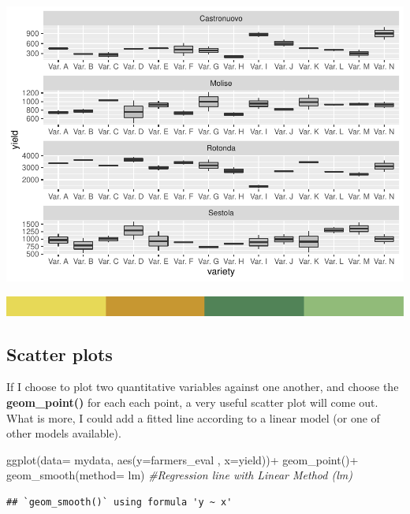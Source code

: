 \documentclass[
]{book}
\newenvironment{Shaded}{\begin{snugshade}}{\end{snugshade}}
\newcommand{\AttributeTok}[1]{\textcolor[rgb]{0.77,0.63,0.00}{#1}}
\newcommand{\CommentTok}[1]{\textcolor[rgb]{0.56,0.35,0.01}{\textit{#1}}}
\newcommand{\FunctionTok}[1]{\textcolor[rgb]{0.00,0.00,0.00}{#1}}
\newcommand{\NormalTok}[1]{#1}
\newcommand{\SpecialCharTok}[1]{\textcolor[rgb]{0.00,0.00,0.00}{#1}}
\begin{document}
\includegraphics[width=1.5\linewidth]{PPB-Toolkit-for-R-and-R-Studio_files/figure-latex/unnamed-chunk-69-1}

\includegraphics{rsrstrip.png}

\hypertarget{scatter-plots}{%
\subsection{Scatter plots}\label{scatter-plots}}

If I choose to plot two quantitative variables against one another, and choose the \textbf{geom\_point() } for each each point, a very useful scatter plot will come out. What is more, I could add a fitted line according to a linear model (or one of other models available).

\begin{Shaded}
\begin{Highlighting}[]
\FunctionTok{ggplot}\NormalTok{(}\AttributeTok{data=}\NormalTok{ mydata, }\FunctionTok{aes}\NormalTok{(}\AttributeTok{y=}\NormalTok{farmers\_eval ,  }\AttributeTok{x=}\NormalTok{yield))}\SpecialCharTok{+}
                   \FunctionTok{geom\_point}\NormalTok{()}\SpecialCharTok{+}
                   \FunctionTok{geom\_smooth}\NormalTok{(}\AttributeTok{method=}\NormalTok{ lm) }\CommentTok{\#Regression line with Linear Method (lm)}
\end{Highlighting}
\end{Shaded}

\begin{verbatim}
## `geom_smooth()` using formula 'y ~ x'
\end{verbatim}
\end{document}

